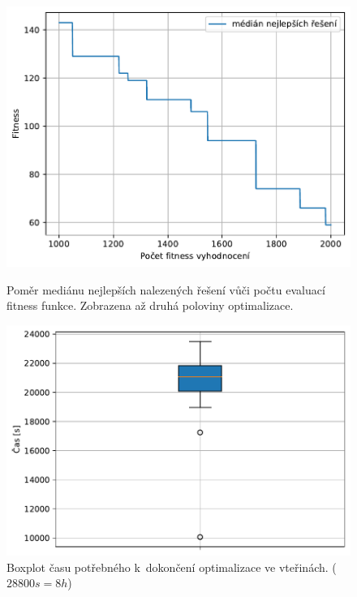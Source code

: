 \begin{figure}[H]
\begin{minipage}[t]{0.475\linewidth}
	\includegraphics[width=\textwidth]{obrazky-figures/statistics/HIFU/blob/20/SA/bestsToFitness_1.pdf}
	\caption{Poměr mediánu nejlepších nalezených řešení vůči počtu evaluací fitness funkce.  Zobrazena až druhá poloviny optimalizace.}
	\label{fg:hifu:blob:sa:fitPerf}
\end{minipage}
\hfill
\begin{minipage}[t]{0.475\linewidth}
\includegraphics[width=\linewidth]{obrazky-figures/statistics/HIFU/blob/20/SA/timeBoxplot_WithOutliers.pdf}
\caption{Boxplot času potřebného k~dokončení optimalizace ve vteřinách. ($28800s = 8h$)}
\label{fg:hifu:blob:sa:time}
\end{minipage}
\end{figure}



